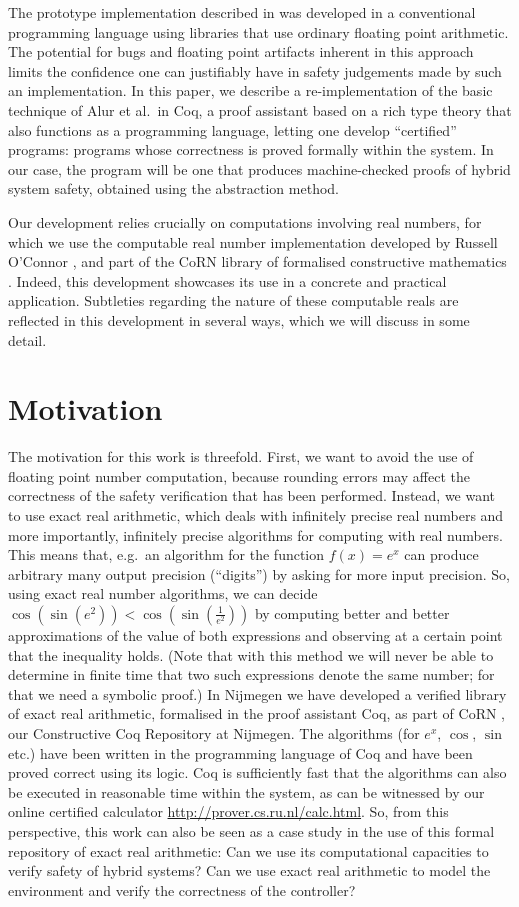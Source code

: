 \documentclass[runningheads]{llncs}
\begin{document}
The prototype implementation described in \cite{alur} was developed in
a conventional programming language using libraries that use ordinary
floating point arithmetic. The potential for bugs and floating point
artifacts inherent in this approach limits the confidence one can
justifiably have in safety judgements made by such an
implementation. In this paper, we describe a re-implementation of the
basic technique of Alur et al.\ in Coq, a proof assistant based on a
rich type theory that also functions as a programming language,
letting one develop ``certified'' programs: programs whose correctness
is proved formally within the system. In our case, the program will be
one that produces machine-checked proofs of hybrid system safety,
obtained using the abstraction method.

Our development relies crucially on computations involving real
numbers, for which we use the computable real number implementation
developed by Russell O'Connor \cite{oconnor}, and part of the CoRN
library of formalised constructive mathematics \cite{corn}. Indeed,
this development showcases its use in a concrete and practical
application. Subtleties regarding the nature of these computable reals
are reflected in this development in several ways, which we will
discuss in some detail.

\section{Motivation}
The motivation for this work is threefold. 
First, we want to avoid the use of floating point number computation,
because rounding errors may affect the correctness of the safety
verification that has been performed. Instead, we want to use exact
real arithmetic, which deals with infinitely precise real numbers and
more importantly, infinitely precise algorithms for computing with
real numbers. This means that, e.g.\ an algorithm for the function
$f(x) = e^x$ can produce arbitrary many output precision (``digits'')
by asking for more input precision. So, using exact real number
algorithms, we can decide $\cos(\sin(e^2))<\cos(\sin(\frac{1}{e^2}))$
by computing better and better approximations of the value of both
expressions and observing at a certain point that the inequality
holds. (Note that with this method we will never be able to determine
in finite time that two such expressions denote the same number; for
that we need a symbolic proof.) In Nijmegen we have developed a
verified library of exact real arithmetic, formalised in the proof
assistant Coq, as part of CoRN \cite{corn,oconnor}, our Constructive
Coq Repository at Nijmegen. The algorithms (for $e^x$, $\cos$, $\sin$
etc.) have been written in the programming language of Coq and have
been proved correct using its logic. Coq is sufficiently fast that the
algorithms can also be executed in reasonable time within the system,
as can be witnessed by our online certified calculator
\url{http://prover.cs.ru.nl/calc.html}. So, from this perspective,
this work can also be seen as a case study in the use of this formal
repository of exact real arithmetic: Can we use its computational
capacities to verify safety of hybrid systems? Can we use exact real
arithmetic to model the environment and verify the correctness of the
controller?
\end{document}
